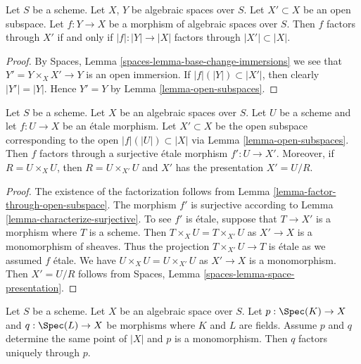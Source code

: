 \begin{lemma}
\label{lemma-factor-through-open-subspace}
Let $S$ be a scheme.
Let $X$, $Y$ be algebraic spaces over $S$.
Let $X' \subset X$ be an open subspace.
Let $f : Y \to X$ be a morphism of algebraic spaces over $S$.
Then $f$ factors through $X'$ if and only if $|f| : |Y| \to |X|$
factors through $|X'| \subset |X|$.
\end{lemma}

\begin{proof}
By Spaces, Lemma \ref{spaces-lemma-base-change-immersions}
we see that $Y' = Y \times_X X' \to Y$ is an open immersion.
If $|f|(|Y|) \subset |X'|$, then clearly $|Y'| = |Y|$. Hence $Y' = Y$ by
Lemma \ref{lemma-open-subspaces}.
\end{proof}

\begin{lemma}
\label{lemma-etale-image-open}
Let $S$ be a scheme. Let $X$ be an algebraic spaces over $S$.
Let $U$ be a scheme and let $f : U \to X$ be an \'etale morphism.
Let $X' \subset X$ be the open subspace corresponding to
the open $|f|(|U|) \subset |X|$ via
Lemma \ref{lemma-open-subspaces}.
Then $f$ factors through a surjective \'etale morphism $f' : U \to X'$.
Moreover, if $R = U \times_X U$, then $R = U \times_{X'} U$ and $X'$ has
the presentation $X' = U/R$.
\end{lemma}

\begin{proof}
The existence of the factorization follows from
Lemma \ref{lemma-factor-through-open-subspace}.
The morphism $f'$ is surjective according to
Lemma \ref{lemma-characterize-surjective}.
To see $f'$ is \'etale, suppose that $T \to X'$ is a morphism
where $T$ is a scheme. Then $T \times_X U = T \times_{X'} U$
as $X' \to X$ is a monomorphism of sheaves. Thus the projection
$T \times_{X'} U \to T$ is \'etale as we assumed $f$ \'etale.
We have $U \times_X U = U \times_{X'} U$ as $X' \to X$ is a monomorphism.
Then $X' = U/R$ follows from
Spaces, Lemma \ref{spaces-lemma-space-presentation}.
\end{proof}

\begin{lemma}
\label{lemma-equivalence-class-point-monomorphism}
Let $S$ be a scheme. Let $X$ be an algebraic space over $S$.
Let $p : \Spec(K) \to X$ and $q : \Spec(L) \to X$
be morphisms where $K$ and $L$ are fields. Assume $p$ and $q$
determine the same point of $|X|$ and $p$ is a monomorphism.
Then $q$ factors uniquely through $p$.
\end{lemma}

